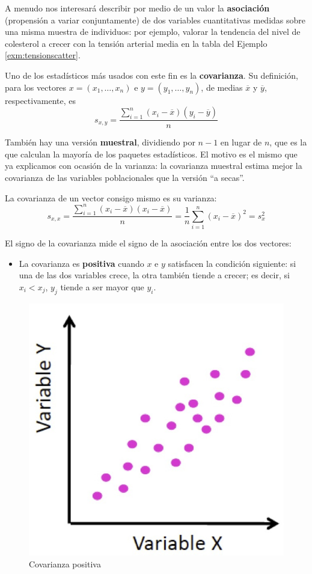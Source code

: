 \documentclass[
]{book}
\providecommand{\tightlist}{%
  \setlength{\itemsep}{0pt}\setlength{\parskip}{0pt}}
\theoremstyle{definition}
\theoremstyle{definition}
\theoremstyle{definition}
\theoremstyle{definition}
\theoremstyle{remark}
\begin{document}
A menudo nos interesará describir por medio de un valor la \textbf{asociación} (propensión a variar conjuntamente) de dos variables cuantitativas medidas sobre una misma muestra de individuos: por ejemplo, valorar la tendencia del nivel de colesterol a crecer con la tensión arterial media en la tabla del Ejemplo \ref{exm:tensionscatter}.

Uno de los estadísticos más usados con este fin es la \textbf{covarianza}. Su definición, para los vectores \(x=(x_1,\ldots,x_n)\) e \(y=(y_1,\ldots,y_n)\), de medias \(\overline{x}\) y \(\overline{y}\), respectivamente, es
\[
s_{x,y}=\frac{\sum_{i=1}^n (x_i-\overline{x})(y_i-\overline{y})}{n}
\]

\begin{rmdcaution}
También hay una versión \textbf{muestral}, dividiendo por \(n-1\) en lugar de \(n\), que es la que calculan la mayoría de los paquetes estadísticos. El motivo es el mismo que ya explicamos con ocasión de la varianza: la covarianza muestral estima mejor la covarianza de las variables poblacionales que la versión ``a secas''.
\end{rmdcaution}

\begin{rmdimportant}
La covarianza de un vector consigo mismo es su varianza:
\[
s_{x,x}=\frac{\sum_{i=1}^n (x_i-\overline{x})(x_i-\overline{x})}{n}=\frac{1}{n}\sum_{i=1}^n (x_i-\overline{x})^2=s_x^2
\]
\end{rmdimportant}

El signo de la covarianza mide el signo de la asociación entre los dos vectores:

\begin{itemize}
\tightlist
\item
  La covarianza es \textbf{positiva} cuando \(x\) e \(y\) satisfacen la condición siguiente: si una de las dos variables crece, la otra también tiende a crecer; es decir, si \(x_i<x_j\), \(y_j\) tiende a ser mayor que \(y_i\).
\end{itemize}

\begin{figure}

{\centering \includegraphics[width=0.5\linewidth]{INREMDN_files/figure-html/covpos} 

}

\caption{Covarianza positiva}\label{fig:unnamed-chunk-306}
\end{figure}
\end{document}
